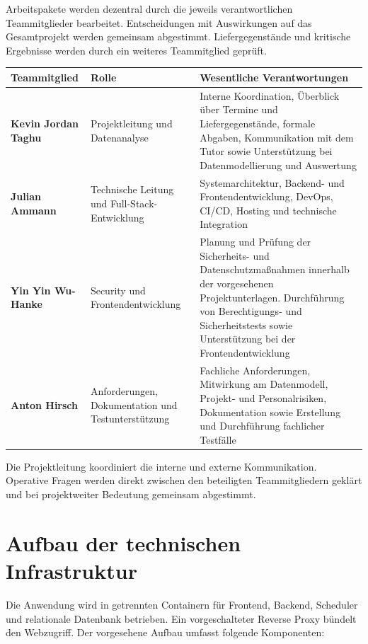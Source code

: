 \documentclass[11pt,a4paper]{article}
\begin{document}
Arbeitspakete werden dezentral durch die jeweils verantwortlichen Teammitglieder bearbeitet. Entscheidungen mit Auswirkungen auf das Gesamtprojekt werden gemeinsam abgestimmt. Liefergegenstände und kritische Ergebnisse werden durch ein weiteres Teammitglied geprüft.

\begin{tabularx}{\linewidth}{@{}>{\raggedright\arraybackslash}p{3.1cm} >{\raggedright\arraybackslash}p{3.9cm} Y@{}}
\toprule
\textbf{Teammitglied} & \textbf{Rolle} & \textbf{Wesentliche Verantwortungen} \\
\midrule
\textbf{Kevin Jordan Taghu} & Projektleitung und Datenanalyse & Interne Koordination, Überblick über Termine und Liefergegenstände, formale Abgaben, Kommunikation mit dem Tutor sowie Unterstützung bei Datenmodellierung und Auswertung \\
\textbf{Julian Ammann} & Technische Leitung und Full-Stack-Entwicklung & Systemarchitektur, Backend- und Frontend\-entwicklung, DevOps, CI/CD, Hosting und technische Integration \\
\textbf{Yin Yin Wu-Hanke} & Security und Frontend\-entwicklung & Planung und Prüfung der Sicherheits- und Datenschutzmaßnahmen innerhalb der vorgesehenen Projekt\-unterlagen. Durchführung von Berechtigungs- und Sicherheitstests sowie Unterstützung bei der Frontendentwicklung \\
\textbf{Anton Hirsch} & Anforderungen, Dokumentation und Testunterstützung & Fachliche Anforderungen, Mitwirkung am Daten\-modell, Projekt- und Personalrisiken, Dokumentation sowie Erstellung und Durchführung fachlicher \mbox{Testfälle} \\
\bottomrule
\end{tabularx}

Die Projektleitung koordiniert die interne und externe Kommunikation. Operative Fragen werden direkt zwischen den beteiligten Teammitgliedern geklärt und bei projektweiter Bedeutung gemeinsam abgestimmt.

\section{Aufbau der technischen Infrastruktur}

Die Anwendung wird in getrennten Containern für Frontend, Backend, Scheduler und relationale Datenbank betrieben. Ein vorgeschalteter Reverse Proxy bündelt den Webzugriff. Der vorgesehene Aufbau umfasst folgende Komponenten:
\end{document}
